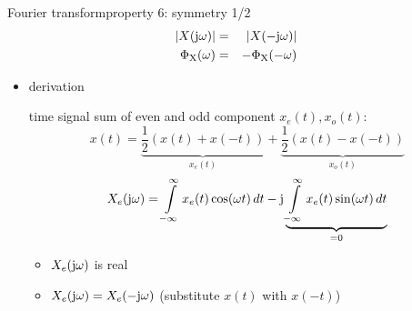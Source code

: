 	\begin{frame}{Fourier transform}{property 6: symmetry 1/2}
		\begin{eqnarray*}
			|X(\mathrm{j}\omega)| &=& |X(-\mathrm{j}\omega)|\\
			\Phi_\mathrm{X}(\omega) &=& -\Phi_\mathrm{X}(-\omega) 
		\end{eqnarray*}

		\vspace{-5mm}
		\begin{itemize}
			\item<2->[]	derivation
			
			\begin{footnotesize}
				time signal sum of even and odd component $x_e(t), x_o(t)$:
				\begin{equation*}
					x(t) = \underbrace{\frac{1}{2}(x(t) + x(-t))}_{x_e(t)} + \underbrace{\frac{1}{2}(x(t) - x(-t))}_{x_o(t)} 
				\end{equation*}
				\pause
				\begin{equation*}
					X_e(\mathrm{j}\omega) = \int\limits_{-\infty}^{\infty}{x_e(t)\cos(\omega t)\,dt} - \mathrm{j} \underbrace{\int\limits_{-\infty}^{\infty}{x_e(t)\sin(\omega t)\,dt}}_{= 0}\nonumber
				\end{equation*}
				
		\vspace{-5mm}
				\begin{itemize}
					\item<4->[$\Rightarrow$]	$X_e(\mathrm{j}\omega)$ is real
					\item<4->[$\Rightarrow$]	$X_e(\mathrm{j}\omega) = X_e(-\mathrm{j}\omega)$ (substitute $x(t)$ with $x(-t)$)
				\end{itemize}
			\end{footnotesize}
		\end{itemize}
	\end{frame}	


